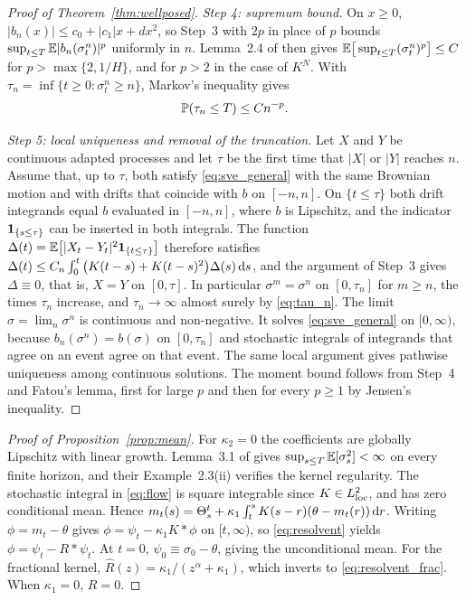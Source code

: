 \begin{proof}[Proof of Theorem~\ref{thm:wellposed}]
\emph{Step 4: supremum bound.} On $x\ge0$, $|b_n(x)|\le c_0+|c_1|x+dx^2$, so Step~3 with $2p$ in place of $p$ bounds $\sup_{t\le T}\mathbb{E}|b_n(\sigma^n_t)|^p$ uniformly in $n$. Lemma~2.4 of \citet{AbiJaberLarssonPulido2019} then gives $\mathbb{E}\big[\sup_{t\le T}(\sigma^n_t)^p\big]\le C$ for $p>\max\{2,1/H\}$, and for $p>2$ in the case of $K^N$. With $\tau_n=\inf\{t\ge0:\sigma^n_t\ge n\}$, Markov's inequality gives
\begin{equation}\label{eq:tau_n}
\P(\tau_n\le T)\le Cn^{-p} .
\end{equation}

\emph{Step 5: local uniqueness and removal of the truncation.} Let $X$ and $Y$ be continuous adapted processes and let $\tau$ be the first time that $|X|$ or $|Y|$ reaches $n$. Assume that, up to $\tau$, both satisfy \eqref{eq:sve_general} with the same Brownian motion and with drifts that coincide with $b$ on $[-n,n]$. On $\{t\le\tau\}$ both drift integrands equal $b$ evaluated in $[-n,n]$, where $b$ is Lipschitz, and the indicator $\mathbf{1}_{\{s\le\tau\}}$ can be inserted in both integrals. The function $\Delta(t)=\mathbb{E}\big[|X_t-Y_t|^2\mathbf{1}_{\{t\le\tau\}}\big]$ therefore satisfies $\Delta(t)\le C_n\int_0^t\big(K(t-s)+K(t-s)^2\big)\Delta(s)\,\mathrm{d} s$, and the argument of Step~3 gives $\Delta\equiv0$, that is, $X=Y$ on $[0,\tau]$. In particular $\sigma^m=\sigma^n$ on $[0,\tau_n]$ for $m\ge n$, the times $\tau_n$ increase, and $\tau_n\to\infty$ almost surely by \eqref{eq:tau_n}. The limit $\sigma=\lim_n\sigma^n$ is continuous and non-negative. It solves \eqref{eq:sve_general} on $[0,\infty)$, because $b_n(\sigma^n)=b(\sigma)$ on $[0,\tau_n]$ and stochastic integrals of integrands that agree on an event agree on that event. The same local argument gives pathwise uniqueness among continuous solutions. The moment bound follows from Step~4 and Fatou's lemma, first for large $p$ and then for every $p\ge1$ by Jensen's inequality.
\end{proof}

\begin{proof}[Proof of Proposition~\ref{prop:mean}] For $\kappa_2=0$ the coefficients are globally Lipschitz with linear growth. Lemma~3.1 of \citet{AbiJaberLarssonPulido2019} gives $\sup_{s\le T}\mathbb{E}[\sigma_s^2]<\infty$ on every finite horizon, and their Example~2.3(ii) verifies the kernel regularity. The stochastic integral in \eqref{eq:flow} is square integrable since $K\in L^2_{\rm loc}$, and has zero conditional mean. Hence $m_t(s)=\Theta^t_s+\kappa_1\int_t^sK(s-r)(\theta-m_t(r))\,\mathrm{d} r$. Writing $\phi=m_t-\theta$ gives $\phi=\psi_t-\kappa_1K*\phi$ on $[t,\infty)$, so \eqref{eq:resolvent} yields $\phi=\psi_t-R*\psi_t$. At $t=0$, $\psi_0\equiv\sigma_0-\theta$, giving the unconditional mean. For the fractional kernel, $\widehat R(z)=\kappa_1/(z^\alpha+\kappa_1)$, which inverts to \eqref{eq:resolvent_frac}. When $\kappa_1=0$, $R=0$.
\end{proof}

